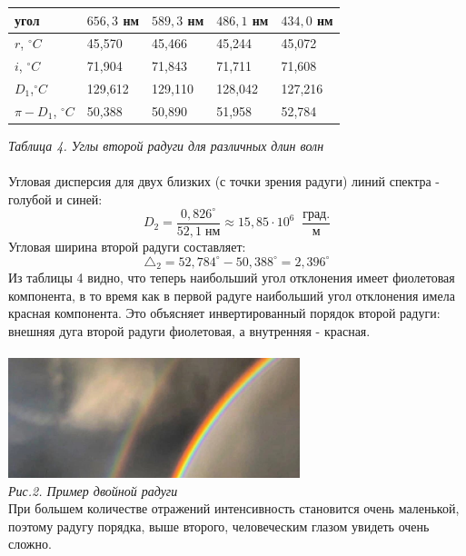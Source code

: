 \documentclass[a4paper]{article}
\begin{document}
\begin{multicols}{2}
\begin{enumerate}
\begin{equation}
\label{short}
\end{equation}
\begin{center}
\footnotesize
\begin{tabular}{|l|l|l|l|l|}
\hline
угол & $656,3$ нм & $589,3$ нм & $486,1$ нм & $434,0$ нм\\
\hline
$r$, $^{\circ}C$  & 45,570 & 45,466 & 45,244 & 45,072\\
\hline 
$i$, $^{\circ}C$ & 71,904 & 71,843 & 71,711 & 71,608\\
\hline
$D_1$,$^{\circ}C$ & 129,612 & 129,110 & 128,042 & 127,216\\
\hline
$\pi - D_1$, $^{\circ}C$ & 50,388 & 50,890 & 51,958 & 52,784\\
\hline  
\end{tabular}
\end{center}
\textit{ Таблица 4. Углы второй радуги для различных длин волн}\\
\\
Угловая дисперсия для двух близких (с точки зрения радуги) линий спектра - голубой и синей:
\begin{equation}
D_2 = \frac{0,826^{\circ}}{52,1 \; \textit{нм}} \approx 15,85 \cdot 10^6 \; \; \frac{\textit{град.}}{\textit{м}}
\label{short}
\end{equation}
Угловая ширина второй радуги составляет:
\begin{equation}
\triangle_2 = 52,784^{\circ} - 50,388^{\circ} = 2,396^{\circ} 
\label{short}
\end{equation}
Из таблицы 4 видно, что теперь наибольший угол отклонения имеет фиолетовая компонента, в то время как в первой радуге наибольший угол отклонения имела красная компонента. Это объясняет инвертированный порядок второй радуги: внешняя дуга второй радуги фиолетовая, а внутренняя - красная.\\
\\
\includegraphics[width=8.5cm]{g2}\\
\textit{Рис.2. Пример двойной радуги}\\
При большем количестве отражений интенсивность становится очень маленькой, поэтому радугу порядка, выше второго, человеческим глазом увидеть очень сложно. \\

\end{enumerate}
\end{multicols}
\end{document}
